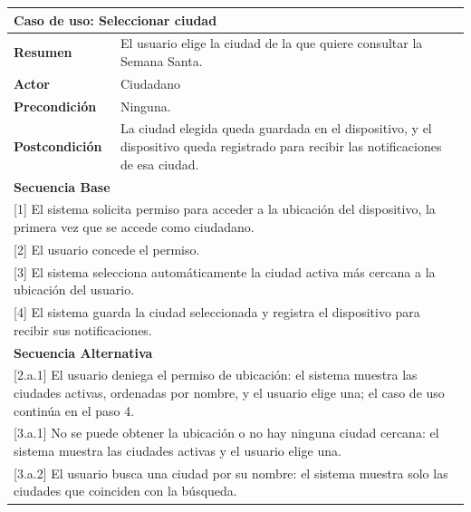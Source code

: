 \begin{table}[h!]
    \centering
    \renewcommand{\arraystretch}{1.5}

    \begin{tabular}{|p{4cm}|p{11cm}|}
        \hline
        \multicolumn{2}{|l|}{\textbf{Caso de uso: Seleccionar ciudad}} \\
        \hline
        \textbf{Resumen} & El usuario elige la ciudad de la que quiere consultar la Semana Santa. \\
        \hline
        \textbf{Actor} & Ciudadano \\
        \hline
        \textbf{Precondición} & Ninguna. \\
        \hline
        \textbf{Postcondición} & La ciudad elegida queda guardada en el dispositivo, y el dispositivo queda registrado para recibir las notificaciones de esa ciudad. \\
        \hline
        \multicolumn{2}{|l|}{\textbf{Secuencia Base}} \\
        \hline
        \multicolumn{2}{|p{15cm}|}{ [1] El sistema solicita permiso para acceder a la ubicación del dispositivo, la primera vez que se accede como ciudadano. } \\
        \hline
        \multicolumn{2}{|p{15cm}|}{ [2] El usuario concede el permiso. } \\
        \hline
        \multicolumn{2}{|p{15cm}|}{ [3] El sistema selecciona automáticamente la ciudad activa más cercana a la ubicación del usuario. } \\
        \hline
        \multicolumn{2}{|p{15cm}|}{ [4] El sistema guarda la ciudad seleccionada y registra el dispositivo para recibir sus notificaciones. } \\
        \hline
        \multicolumn{2}{|l|}{\textbf{Secuencia Alternativa}} \\
        \hline
        \multicolumn{2}{|p{15cm}|}{ [2.a.1] El usuario deniega el permiso de ubicación: el sistema muestra las ciudades activas, ordenadas por nombre, y el usuario elige una; el caso de uso continúa en el paso 4. } \\
        \hline
        \multicolumn{2}{|p{15cm}|}{ [3.a.1] No se puede obtener la ubicación o no hay ninguna ciudad cercana: el sistema muestra las ciudades activas y el usuario elige una. } \\
        \hline
        \multicolumn{2}{|p{15cm}|}{ [3.a.2] El usuario busca una ciudad por su nombre: el sistema muestra solo las ciudades que coinciden con la búsqueda. } \\

\end{tabular}
\end{table}
